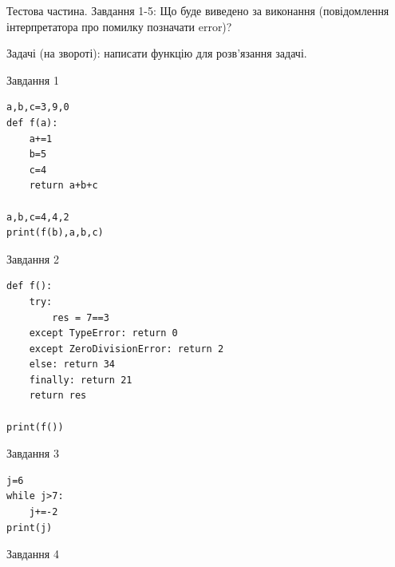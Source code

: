 \documentclass[12pt, ukrainian]{article}
\begin{document}
{{{{{{{{{{{{{{{Тестова частина. Завдання 1-5: Що буде виведено за виконання (повідомлення інтерпретатора про помилку позначати error)?

Задачі (на звороті): написати функцію для розв'язання задачі.

\vspace{5mm} \begin{minipage}[t]{8.5cm}
               
{\begin{center}Завдання {1}\end{center}}
\vspace{-6mm}

\begin{verbatim}
a,b,c=3,9,0
def f(a):
    a+=1
    b=5
    c=4
    return a+b+c

a,b,c=4,4,2
print(f(b),a,b,c)
\end{verbatim}


\vspace{5mm}
               
{\begin{center}Завдання {2}\end{center}}
\vspace{-6mm}

\begin{verbatim}
def f():
    try:
        res = 7==3
    except TypeError: return 0
    except ZeroDivisionError: return 2
    else: return 34
    finally: return 21
    return res

print(f())
\end{verbatim}


\vspace{5mm}
               
{\begin{center}Завдання {3}\end{center}}
\vspace{-6mm}

\begin{verbatim}
j=6
while j>7:
    j+=-2
print(j)
\end{verbatim}


\end{minipage}
\vline \hspace{6mm}
\begin{minipage}[t]{10.7cm}
               
{\begin{center}Завдання {4}\end{center}}
\vspace{-6mm}


\end{minipage}}}}}}}}}}}}}}}}
\end{document}
